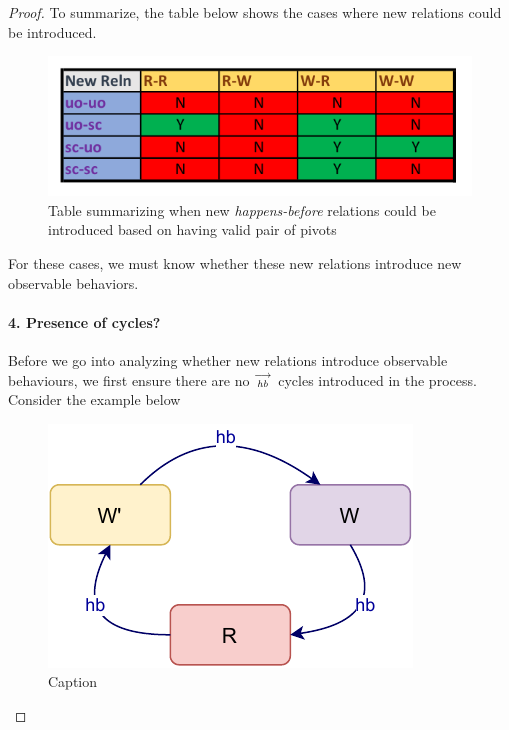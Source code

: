 \begin{proof}
       
       
        To summarize, the table below shows the cases where new relations could be introduced. 
        \begin{figure}[H]
            \centering
            \includegraphics[scale=0.7]{Table2_Final.pdf}
            \caption{Table summarizing when new \textit{happens-before} relations could be introduced based on having valid pair of pivots }
            \label{fig:my_label}
        \end{figure}

        For these cases, we must know whether these new relations introduce new observable behaviors. 
        
    \paragraph{4. Presence of cycles?}
        Before we go into analyzing whether new relations introduce observable behaviours, we first ensure there are no $\stackrel{\longrightarrow}{_\textit{hb}}$ cycles introduced in the process. Consider the example below
        \begin{figure}[H]
            \centering
            \includegraphics[scale=0.7]{Q4(a).pdf}
            \caption{Caption}
            \label{fig:my_label}
        \end{figure}
        

\end{proof}
